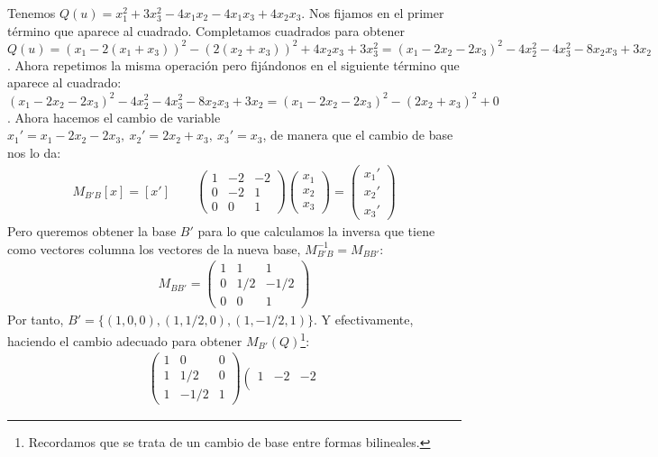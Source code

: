 \documentclass[14pt]{book}
\begin{document}
\begin{ej}
	Tenemos $Q(u) = x_1^2 + 3x_3^2 - 4x_1x_2 - 4x_1x_3 + 4x_2x_3$. Nos fijamos en el primer término que aparece al cuadrado. Completamos cuadrados para obtener $Q(u) = (x_1 - 2(x_1 + x_3))^2 - (2(x_2 + x_3))^2 + 4x_2x_3 + 3x_3^2 = (x_1 - 2x_2 - 2x_3)^2 - 4x_2^2 - 4x_3^2 - 8x_2x_3 + 3x_2$. Ahora repetimos la misma operación pero fijándonos en el siguiente término que aparece al cuadrado: $(x_1 - 2x_2 - 2x_3)^2 - 4x_2^2 - 4x_3^2 - 8x_2x_3 + 3x_2 = (x_1 - 2x_2 - 2x_3)^2 - (2x_2 + x_3)^2 + 0$. Ahora hacemos el cambio de variable $x_1' = x_1 - 2x_2 - 2x_3,\ x_2' = 2x_2 + x_3,\ x_3' = x_3$, de manera que el cambio de base nos lo da:
	\begin{align*}
		M_{B'B}[x] = [x'] \qquad
		\left(\begin{array}{ccc}
		1 & -2 & -2 \\
		0 & -2 & 1 \\
		0 & 0 & 1
		\end{array}\right)\left(\begin{array}{c}
		x_1 \\ x_2 \\ x_3
		\end{array}\right) = \left(\begin{array}{c}
		x_1' \\ x_2' \\ x_3'
		\end{array}\right)
	\end{align*}
	Pero queremos obtener la base $B'$ para lo que calculamos la inversa que tiene como vectores columna los vectores de la nueva base, $M_{B'B}^{-1} = M_{BB'}$:
	\begin{align*}
		M_{BB'} = \left(\begin{array}{ccc}
		1 & 1 & 1 \\
		0 & 1/2 & -1/2 \\
		0 & 0 & 1
		\end{array}\right)
	\end{align*}
	Por tanto, $B' = \{(1, 0, 0), (1, 1/2, 0), (1, -1/2, 1)\}$. Y efectivamente, haciendo el cambio adecuado para obtener $M_{B'}(Q)$\footnote{Recordamos que se trata de un cambio de base entre formas bilineales.}:
	\begin{align*}
		\left(\begin{array}{ccc}
		1 & 0 & 0 \\
		1 & 1/2 & 0 \\
		1 & -1/2 & 1
		\end{array}\right)\left(\begin{array}{ccc}
		1 & -2 & -2 \\

\end{array}
\end{align*}
\end{ej}
\end{document}
